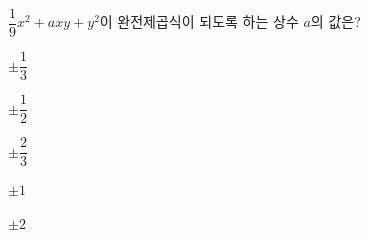 $\dfrac{1}{9}x^2+axy+y^2$이 완전제곱식이 되도록 하는 상수 $a$의 값은?
\begin{choices32}{\rule[-3ex]{0pt}{8ex}$\pm\dfrac{1}{3}$}{\rule[-3ex]{0pt}{8ex}$\pm\dfrac{1}{2}$}{\rule[-3ex]{0pt}{8ex}$\pm\dfrac{2}{3}$}{\rule[-3ex]{0pt}{8ex}$\pm 1$}{\rule[-3ex]{0pt}{8ex}$\pm 2$}\end{choices32}
